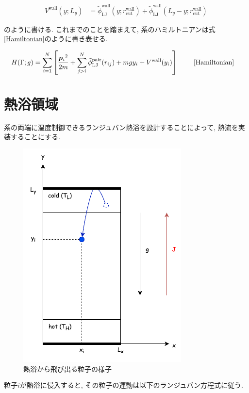 \begin{align}
  V^{\text{wall}}(y; L_y) &= \tilde{\phi}_{\text{LJ}}^{\text{wall}}(y;r_{\text{cut}}^{\text{wall}}) + \tilde{\phi}_{\text{LJ}}^{\text{wall}}(L_y - y;r_{\text{cut}}^{\text{wall}})
\end{align}

のように書ける. これまでのことを踏まえて, 系のハミルトニアンは式\eqref{Hamiltonian}のように書き表せる.

\begin{align}
    H(\Gamma; g)
    &= \sum_{i=1}^{N}
    \left[
      \frac{{\bm{p}_i}^2}{2m} 
      + \sum_{j > i}^{N}
        \tilde{\phi}_{\text{LJ}}^{\text{pair}}(r_{ij})
      + mgy_i +V^{\text{wall}}(y_i)
    \right] \ \tag*{\eqref{Hamiltonian}} 
\end{align}

\section{熱浴領域}\label{sec:heat_region}

系の両端に温度制御できるランジュバン熱浴を設計することによって, 熱流を実装することにする.

\begin{figure}[H]
  \centering
  \includegraphics[scale=0.5]{image/system_heatflux.png}
  \caption{熱浴から飛び出る粒子の様子}
  \label{}
\end{figure}

粒子$i$が熱浴に侵入すると, その粒子の運動は以下のランジュバン方程式に従う. 

